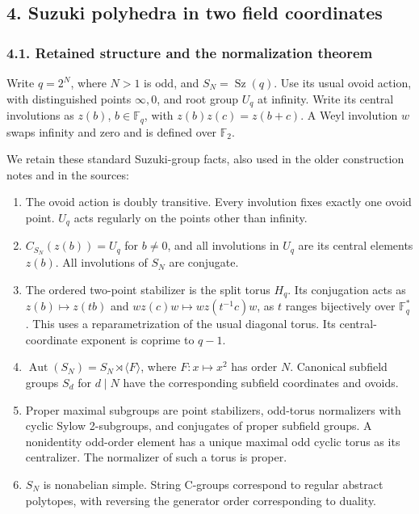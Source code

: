 \documentclass[
  11pt,
  a4paper,
]{article}
\providecommand{\tightlist}{%
  \setlength{\itemsep}{0pt}\setlength{\parskip}{0pt}}
\begin{document}
\subsection{4. Suzuki polyhedra in two field
coordinates}\label{suzuki-polyhedra-in-two-field-coordinates}

\subsubsection{4.1. Retained structure and the normalization
theorem}\label{retained-structure-and-the-normalization-theorem}

Write \(q=2^N\), where \(N>1\) is odd, and \(S_N=\operatorname{Sz}(q)\).
Use its usual ovoid action, with distinguished points \(\infty,0\), and
root group \(U_q\) at infinity. Write its central involutions as
\(z(b)\), \(b\in\mathbb F_q\), with \(z(b)z(c)=z(b+c)\). A Weyl
involution \(w\) swaps infinity and zero and is defined over
\(\mathbb F_2\).

We retain these standard Suzuki-group facts, also used in the older
construction notes and in the sources:

\begin{enumerate}
\def\labelenumi{\arabic{enumi}.}
\tightlist
\item
  The ovoid action is doubly transitive. Every involution fixes exactly
  one ovoid point. \(U_q\) acts regularly on the points other than
  infinity.
\item
  \(C_{S_N}(z(b))=U_q\) for \(b\ne0\), and all involutions in \(U_q\)
  are its central elements \(z(b)\). All involutions of \(S_N\) are
  conjugate.
\item
  The ordered two-point stabilizer is the split torus \(H_q\). Its
  conjugation acts as \(z(b)\mapsto z(tb)\) and
  \(wz(c)w\mapsto wz(t^{-1}c)w\), as \(t\) ranges bijectively over
  \(\mathbb F_q^*\). This uses a reparametrization of the usual diagonal
  torus. Its central-coordinate exponent is coprime to \(q-1\).
\item
  \(\operatorname{Aut}(S_N)=S_N\rtimes\langle F\rangle\), where
  \(F:x\mapsto x^2\) has order \(N\). Canonical subfield groups \(S_d\)
  for \(d\mid N\) have the corresponding subfield coordinates and
  ovoids.
\item
  Proper maximal subgroups are point stabilizers, odd-torus normalizers
  with cyclic Sylow 2-subgroups, and conjugates of proper subfield
  groups. A nonidentity odd-order element has a unique maximal odd
  cyclic torus as its centralizer. The normalizer of such a torus is
  proper.
\item
  \(S_N\) is nonabelian simple. String C-groups correspond to regular
  abstract polytopes, with reversing the generator order corresponding
  to duality.
\end{enumerate}
\end{document}
